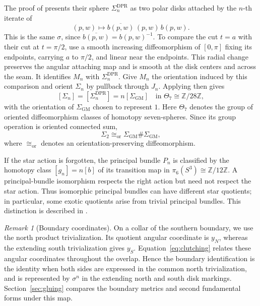 \documentclass[12pt]{amsart}
\numberwithin{equation}{section}
\theoremstyle{remark}
\newtheorem{remark}[theorem]{Remark}
\begin{document}
The proof of \cite[Theorem~1, Section~4]{DPR} presents their sphere
\(\Sigma_n^{\mathrm{DPR}}\) as two polar disks attached by the
\(n\)-th iterate of
\[
 (p,w)\longmapsto\overline{b(p,w)}\,(p,w)\,b(p,w).
\]
This is the same \(\sigma\), since
\(\overline{b(p,w)}=b(p,w)^{-1}\).
To compare the cut \(t=a\) with their cut at \(t=\pi/2\), use a
smooth increasing diffeomorphism of \([0,\pi]\) fixing its endpoints,
carrying \(a\) to \(\pi/2\), and linear near the endpoints.
This radial change preserves the angular attaching map and is
smooth at the disk centers and across the seam. It identifies
\(M_n\) with \(\Sigma_n^{\mathrm{DPR}}\).
Give \(M_n\) the orientation induced by this comparison and
orient \(\Sigma_n\) by pullback through \(J_n\). Applying
\cite[Theorem~1]{DPR} then gives
\[
 [\Sigma_n]=[\Sigma_n^{\mathrm{DPR}}]
          =n[\Sigma_{\mathrm{GM}}]
 \quad\text{in }\Theta_7\cong\mathbb Z/28\mathbb Z,
\]
with the orientation of \(\Sigma_{\mathrm{GM}}\) chosen to represent
\(1\). Here \(\Theta_7\) denotes the group of oriented diffeomorphism
classes of homotopy seven-spheres. Since its group operation is
oriented connected sum,
\[
 \Sigma_2\cong_{\mathrm{or}}
 \Sigma_{\mathrm{GM}}\#\Sigma_{\mathrm{GM}},
\]
where \(\cong_{\mathrm{or}}\) denotes an orientation-preserving
diffeomorphism.

If the star action is forgotten, the principal bundle \(P_n\) is
classified by the homotopy class \([g_n]=n[b]\) of its transition
map in \(\pi_6(S^3)\cong\mathbb Z/12\mathbb Z\). A principal-bundle
isomorphism respects the right action but need not respect the star
action. Thus isomorphic principal bundles can have different star
quotients; in particular, some exotic quotients arise from trivial
principal bundles. This distinction is described in
\cite[Corollary~2.2 and Remark~2.5]{DPR}.

\begin{remark}[Boundary coordinates]\label{rem:boundarycoordinates}
On a collar of the southern boundary, we use the north product
trivialization. Its quotient angular coordinate is \(y_N\), whereas
the extending south trivialization gives \(y_S\).
Equation~\eqref{eq:clutching} relates these angular coordinates
throughout the overlap. Hence the boundary identification is the
identity when both sides are expressed in the common north
trivialization, and is represented by \(\sigma^n\) in the extending
north and south disk markings. Section~\ref{sec:gluing} compares
the boundary metrics and second fundamental forms under this map.
\end{remark}
\end{document}
